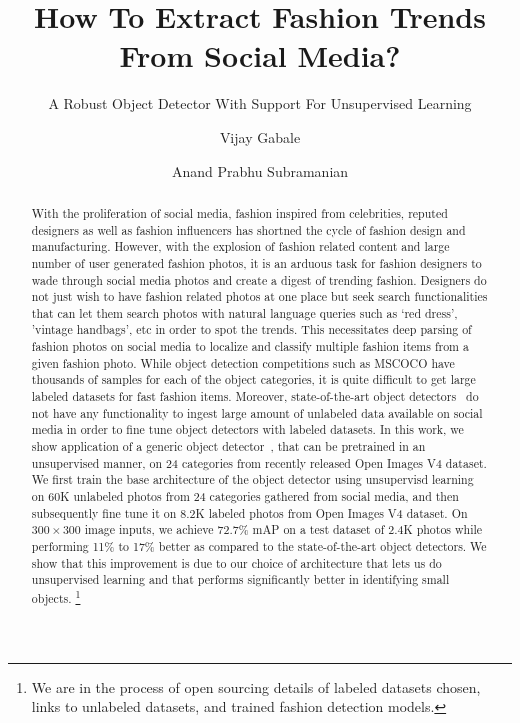 \documentclass[sigconf]{acmart}
\begin{document}
\sloppy

\title{How To Extract Fashion Trends From Social Media?}
\subtitle{A Robust Object Detector With Support For Unsupervised Learning}

\author{Vijay Gabale}

\author{Anand Prabhu Subramanian}


\begin{abstract}
With the proliferation of social media,
fashion inspired from celebrities, reputed designers
as well as fashion influencers has 
shortned the cycle of fashion design and manufacturing.
However, with the explosion of fashion related content
and large number of user generated fashion photos,
it is an arduous task for fashion designers to wade through
social media photos and create a digest
of trending fashion.
Designers do not just wish to have fashion related photos
at one place but seek search functionalities that can let them
search photos with natural language queries such as
`red dress', 'vintage handbags', etc in order to spot the trends.
This necessitates deep parsing of fashion photos on social
media to localize and classify multiple fashion items from a
given fashion photo.
While object detection competitions such as MSCOCO have thousands
of samples for each of the object categories, it is quite difficult
to get large labeled datasets for fast fashion items.
Moreover, state-of-the-art object detectors~\cite{LiuAESRFB16,RedmonCVPR16,FuLRTB17}
do not have any functionality to ingest large amount of unlabeled data
available on social media in order to fine tune object detectors with labeled datasets.
In this work, we show application of a generic object detector~\cite{CDSSD18}, that can 
be pretrained in an unsupervised manner, on 24 categories
from recently released Open Images V4 dataset.
We first train the base architecture of the object detector using
unsupervisd learning on 60K unlabeled photos from 24 categories gathered
from social media, and then subsequently fine tune it on
8.2K labeled photos from Open Images V4 dataset.
On $300 \times 300$ image inputs, 
we achieve 72.7\% mAP on a test dataset of 2.4K photos while
performing 11\% to 17\% better as compared to the state-of-the-art
object detectors. 
We show that this improvement is due to our choice
of architecture that lets us do unsupervised learning and that
performs significantly better in identifying small objects.
\footnote{We are in the process of open sourcing details of labeled datasets
chosen, links to unlabeled datasets, and trained fashion detection models.}

\end{abstract}
\end{document}
